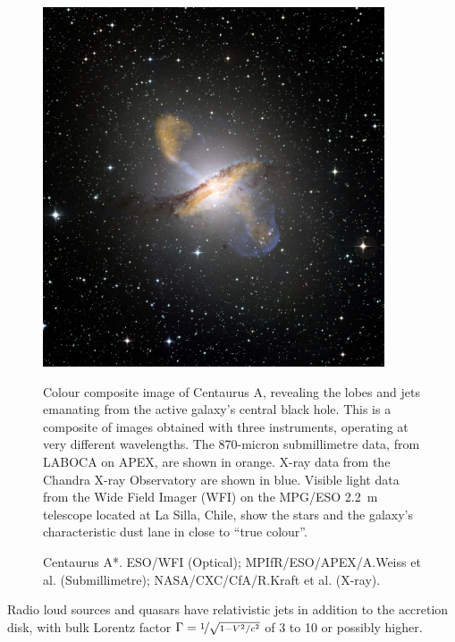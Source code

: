 \documentclass[10pt,a4paper,english]{article}
\begin{document}
\begin{figure}[!ht]
    \noindent
    \begin{minipage}{.6\textwidth}
        \centering
        \includegraphics[width=0.9\textwidth]{eso0903a.jpg}
    \end{minipage}%
    \hfill
    \begin{minipage}{.4\textwidth}
        Colour composite image of Centaurus A, revealing the lobes and jets
        emanating from the active galaxy’s central black hole. This is a
        composite of images obtained with three instruments, operating at very
        different wavelengths. The 870-micron submillimetre data, from LABOCA
        on APEX, are shown in orange. X-ray data from the Chandra X-ray
        Observatory are shown in blue. Visible light data from the Wide Field
        Imager (WFI) on the MPG/ESO \SI{2.2}{\m} telescope located at La Silla, Chile,
        show the stars and the galaxy’s characteristic dust lane in close to
        “true colour”.
    \end{minipage}
    \caption{
        Centaurus A*. ESO/WFI (Optical); MPIfR/ESO/APEX/A.Weiss et al.
        (Submillimetre); NASA/CXC/CfA/R.Kraft et al. (X-ray).
    }
\end{figure}

Radio loud sources and quasars have relativistic jets in addition to the
accretion disk, with bulk Lorentz factor $\Gamma=\nicefrac{1}{\sqrt{1-V^2/c^2}}$
of 3 to 10 or possibly higher.
\end{document}
